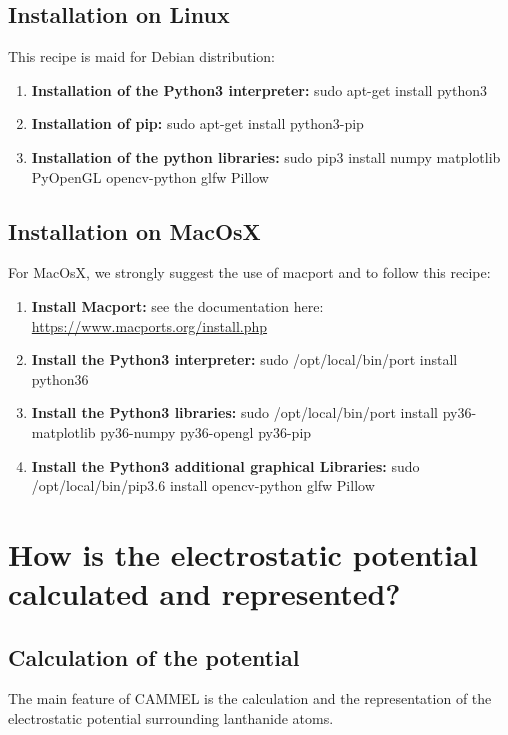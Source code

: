 \documentclass[12pt,a4paper]{article}
\begin{document}
\subsection{Installation on Linux}
This recipe is maid for Debian distribution:
\begin{enumerate}
\item{\textbf{Installation of the Python3 interpreter:} sudo apt-get install python3}
\item{\textbf{Installation of pip:} sudo apt-get install python3-pip}
\item{\textbf{Installation of the python libraries:} sudo pip3 install numpy matplotlib PyOpenGL opencv-python glfw Pillow}
\end{enumerate}

\subsection{Installation on MacOsX}
For MacOsX, we strongly suggest the use of macport and to follow this recipe:
\begin{enumerate}
\item{\textbf{Install Macport:} see the documentation here: \href{https://www.macports.org/install.php}{https://www.macports.org/install.php}}
\item{\textbf{Install the Python3 interpreter:} sudo /opt/local/bin/port install python36}
\item{\textbf{Install the Python3 libraries:} sudo /opt/local/bin/port install py36-matplotlib py36-numpy py36-opengl py36-pip}
\item{\textbf{Install the Python3 additional graphical Libraries:} sudo /opt/local/bin/pip3.6 install opencv-python glfw Pillow}
\end{enumerate}

\section{How is the electrostatic potential calculated and represented?}
\subsection{Calculation of the potential}
The main feature of CAMMEL is the calculation and the representation of the electrostatic potential surrounding lanthanide atoms.\\
\end{document}
